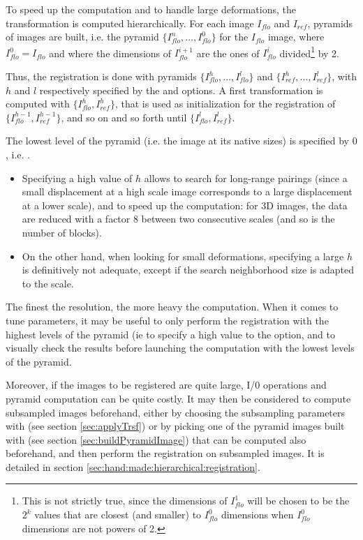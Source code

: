To speed up the computation and to handle large deformations, the transformation is computed hierarchically. For each image 
$I_{flo}$ and $I_{ref}$, pyramids of images are built, i.e. the pyramid $\{I^n_{flo}, \ldots, I^0_{flo}\}$ for the $I_{flo}$ image, where $I^0_{flo} = I_{flo}$ and where the dimensions of $I^{i+1}_{flo}$ are the ones of $I^{i}_{flo}$ divided\footnote{This is not strictly true, since the dimensions of $I^1_{flo}$ will be chosen to be the $2^k$ values that are closest (and smaller) to  $I^0_{flo}$ dimensions when $I^0_{flo}$ dimensions are not powers of 2.} by 2.

Thus, the registration is done with pyramids
$\{I^h_{flo}, \ldots, I^l_{flo}\}$ and $\{I^h_{ref}, \ldots, I^l_{ref}\}$, with $h$ and $l$ respectively specified by the 
 and 
 options. A first transformation is computed with $\{I^h_{flo},I^h_{ref}\}$, that is used as initialization for the registration of  $\{I^{h-1}_{flo},I^{h-1}_{ref}\}$, and so on and so forth until $\{I^l_{flo},I^l_{ref}\}$.

The lowest level of the pyramid (i.e. the image at its native sizes) is specified by $0$, i.e. .

\begin{itemize}
\item Specifying a high value of $h$ allows to search for long-range pairings (since a small displacement at a high scale image corresponds to a large displacement at a lower scale), and to speed up the computation: for 3D images, the data are reduced with a factor 8 between two consecutive scales (and so is the number of blocks).
\item On the other hand, when looking for small deformations, specifying a large $h$ is definitively not adequate, except if the search neighborhood size is adapted to the scale.
\end{itemize}

The finest the resolution, the more heavy the computation. When it comes to tune parameters, it may be useful to only perform the registration with the highest levels of the pyramid (ie to specify a high value to the  option, and to visually check the results before launching the computation with the lowest levels of the pyramid.

Moreover, if the images to be registered are quite large, I/0 operations and pyramid computation can be quite costly. It may then be considered to compute subsampled images beforehand, either by choosing the subsampling parameters with \applyTrsf (see section \ref{sec:applyTrsf}) or by picking one of the pyramid images built with \buildPyramidImage (see section \ref{sec:buildPyramidImage}) that can be computed also beforehand, and then perform the registration on subsampled images. It is detailed in section \ref{sec:hand:made:hierarchical:registration}.





